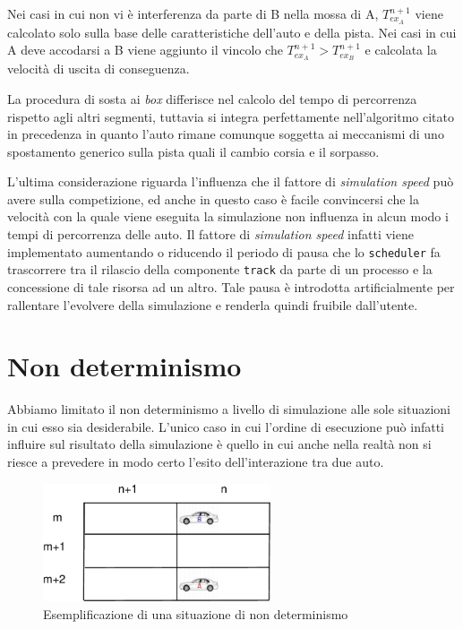 \documentclass[a4paper]{report}
\begin{document}
Nei casi in cui non vi è interferenza da parte di B nella mossa di A, $T_{ex_A}^{n+1}$ viene calcolato solo sulla base delle caratteristiche dell'auto e della pista.
Nei casi in cui A deve accodarsi a B viene aggiunto il vincolo che $T_{ex_A}^{n+1} > T_{ex_B}^{n+1}$ e calcolata la velocità di uscita di conseguenza.

La procedura di sosta ai \textit{box} differisce nel calcolo del tempo di percorrenza rispetto agli altri segmenti, tuttavia si integra perfettamente nell'algoritmo citato in precedenza in quanto l'auto rimane comunque soggetta ai meccanismi di uno spostamento generico sulla pista quali il cambio corsia e il sorpasso.


L'ultima considerazione riguarda l'influenza che il fattore di \textit{simulation speed} può avere sulla competizione, ed anche in questo caso è facile convincersi che la velocità con la quale viene eseguita la simulazione non influenza in alcun modo i tempi di percorrenza delle auto. Il fattore di \textit{simulation speed} infatti viene implementato aumentando o riducendo il periodo di pausa che lo \texttt{scheduler} fa trascorrere tra il rilascio della componente \texttt{track} da parte di un processo e la concessione di tale risorsa ad un altro. Tale pausa è introdotta artificialmente per rallentare l'evolvere della simulazione e renderla quindi fruibile dall'utente.

\section{Non determinismo}
Abbiamo limitato il non determinismo a livello di simulazione alle sole situazioni in cui esso sia desiderabile. L'unico caso in cui l'ordine di esecuzione può infatti influire sul risultato della simulazione è quello in cui anche nella realtà non si riesce a prevedere in modo certo l'esito dell'interazione tra due auto.

\begin{figure}
\begin{center}
\includegraphics[width=0.6\textwidth]{diagrammi/NonDet}
\caption{Esemplificazione di una situazione di non determinismo}
\label{fig:nonDet}
\end{center}
\end{figure}
\end{document}
